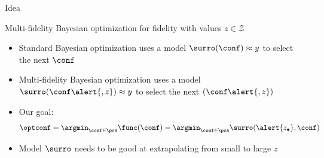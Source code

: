 \begin{frame}[c]{Idea}

\alert{Multi-fidelity Bayesian optimization} for fidelity with values $z\in \mathcal{Z}$ 
\begin{itemize}
	\item Standard Bayesian optimization uses a model $\surro(\conf) \approx y$ to select the next $\conf$
	\item \alert{Multi-fidelity} Bayesian optimization uses a model $\surro(\conf\alert{, z}) \approx y$ to select the next $(\conf\alert{, z})$
    \pause
    \bigskip
    

	
%   


    \item Our goal:
        \begin{equation*}
            \optconf = \argmin_{\conf \in \pcs} \func(\conf) = \argmin_{\conf \in \pcs} \surro(\alert{z_{\bullet}}, \conf)
        \end{equation*}

    \pause
    \bigskip

    \item Model $\surro$ needs to be good at extrapolating from small to large $z$

\end{itemize}




\end{frame}

